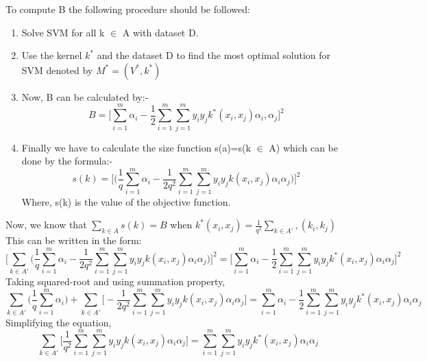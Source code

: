 \documentclass[12pt,a4paper,final]{report}
\begin{document}
{{{{{\begin{itemize}
To compute B the following procedure should be followed: \\
\begin{enumerate}
\item
Solve SVM for all k $\in$ A with dataset D.
\item
Use the kernel $k^*$ and the dataset D to find the most optimal solution for SVM denoted by $M^* = (V^*,k^*)$
\item 
Now, B can be calculated by:- 
\begin{equation}
B = \Big[\sum_{i=1}^{m} \alpha_i - \frac{1}{2}\sum_{i=1}^{m}\sum_{j=1}^{m}y_iy_jk^*(x_i,x_j)\alpha_i,\alpha_j\Big]^2
\end{equation} 
\item
Finally we have to calculate the size function s(a)=s(k $\in$ A) which can be done by the formula:- \\
\begin{equation}
s(k) = \Big[\big(\frac{1}{q}\sum_{i=1}^{m}\alpha_i - \frac{1}{2q^2}\sum_{i=1}^{m}\sum_{j=1}^{m}y_iy_jk(x_i,x_j)\alpha_i\alpha_j\Big)\Big]^2
\end{equation}
Where, s(k) is the value of the objective function. 
\end{enumerate} 
Now, we know that $\sum_{k \in A}^{}s(k)=B$ when $k^*(x_i,x_j)=\frac{1}{q^2}\sum_{k \in A'}^{},(k_i,k_j)$ \\
This can be written in the form: \\
\begin{equation}
\Big[\sum_{k \in A'}^{}\Big(\frac{1}{q}\sum_{i=1}^{m}\alpha_i - \frac{1}{2q^2}\sum_{i=1}^{m}\sum_{j=1}^{m}y_iy_jk(x_i,x_j)\alpha_i\alpha_j\Big) \Big]^2 = \Big[\sum_{i=1}^{m} \alpha_i - \frac{1}{2}\sum_{i=1}^{m}\sum_{j=1}^{m}y_iy_jk^*(x_i,x_j)\alpha_i\alpha_j\Big]^2
\end{equation}
Taking squared-root and using summation property, \\
\begin{equation}
\sum_{k \in A'}\Big(\frac{1}{q}\sum_{i=1}^{m}\alpha_i\Big)+\sum_{k \in A'}^{}\Big[-\frac{1}{2q^2}\sum_{i=1}^{m}\sum_{j=1}^{m}y_iy_jk(x_i,x_j)\alpha_i\alpha_j\Big] = \sum_{i=1}^{m}\alpha_i-\frac{1}{2}\sum_{i=1}^{m}\sum_{j=1}^{m}y_iy_jk^*(x_i,x_j)\alpha_i\alpha_j
\end{equation}
Simplifying the equation,
\begin{equation}
\sum_{k \in A'}\Big[\frac{1}{q^2}\sum_{i=1}^{m}\sum_{j=1}^{m}y_iy_jk(x_i,x_j)\alpha_i\alpha_j\Big] = \sum_{i=1}^{m}\sum_{j=1}^{m}y_iy_jk^*(x_i,x_j)\alpha_i\alpha_j
\end{equation}

\end{itemize}}}}}}
\end{document}
